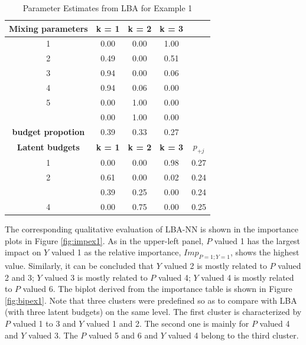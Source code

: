 \documentclass[]{interact}
\theoremstyle{plain}%
\theoremstyle{definition}
\theoremstyle{remark}
\begin{document}
\begin{table}[H]

\caption{\label{tab:lbaex1}Parameter Estimates from LBA for Example 1}
\centering
\begin{tabular}[t]{ccccc}
\toprule
\textbf{Mixing parameters} & \textbf{k = 1} & \textbf{k = 2} & \textbf{k = 3} & \textbf{}\\
\midrule
1 & 0.00 & 0.00 & 1.00 & \\
2 & 0.49 & 0.00 & 0.51 & \\
3 & 0.94 & 0.00 & 0.06 & \\
4 & 0.94 & 0.06 & 0.00 & \\
5 & 0.00 & 1.00 & 0.00 & \\
\addlinespace
6 & 0.00 & 1.00 & 0.00 & \\
\textbf{budget propotion} & 0.39 & 0.33 & 0.27 & \\
\textbf{Latent budgets} & \textbf{k = 1} & \textbf{k = 2} & \textbf{k = 3} & $p_{+j}$\\
1 & 0.00 & 0.00 & 0.98 & 0.27\\
2 & 0.61 & 0.00 & 0.02 & 0.24\\
\addlinespace
3 & 0.39 & 0.25 & 0.00 & 0.24\\
4 & 0.00 & 0.75 & 0.00 & 0.25\\
\bottomrule
\end{tabular}
\end{table}

The corresponding qualitative evaluation of LBA-NN is shown in the
importance plots in Figure \ref{fig:impex1}. As in the upper-left panel,
\(P\) valued 1 has the largest impact on \(Y\) valued 1 as the relative
importance, \(Imp_{P=1;Y=1}\), shows the highest value. Similarly, it
can be concluded that \(Y\) valued 2 is mostly related to \(P\) valued 2
and 3; \(Y\) valued 3 is mostly related to \(P\) valued 4; \(Y\) valued
4 is mostly related to \(P\) valued 6. The biplot derived from the
importance table is shown in Figure \ref{fig:bipex1}. Note that three
clusters were predefined so as to compare with LBA (with three latent
budgets) on the same level. The first cluster is characterized by \(P\)
valued 1 to 3 and \(Y\) valued 1 and 2. The second one is mainly for
\(P\) valued 4 and \(Y\) valued 3. The \(P\) valued 5 and 6 and \(Y\)
valued 4 belong to the third cluster.
\end{document}
